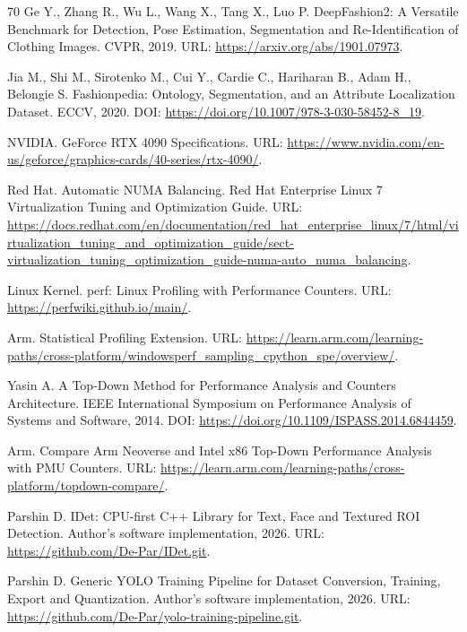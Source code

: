 \documentclass[12pt,a4paper,oneside,openany]{report}
\begin{document}
\begin{thebibliography}{70}
  Ge Y., Zhang R., Wu L., Wang X., Tang X., Luo P. DeepFashion2: A Versatile Benchmark for
  Detection, Pose Estimation, Segmentation and Re-Identification of Clothing Images. CVPR, 2019.
  URL: \url{https://arxiv.org/abs/1901.07973}.

  Jia M., Shi M., Sirotenko M., Cui Y., Cardie C., Hariharan B., Adam H., Belongie S.
  Fashionpedia: Ontology, Segmentation, and an Attribute Localization Dataset. ECCV, 2020. DOI:
  \url{https://doi.org/10.1007/978-3-030-58452-8_19}.


  NVIDIA. GeForce RTX 4090 Specifications. URL:
  \url{https://www.nvidia.com/en-us/geforce/graphics-cards/40-series/rtx-4090/}.

  Red Hat. Automatic NUMA Balancing. Red Hat Enterprise Linux 7 Virtualization Tuning and
  Optimization Guide. URL:
  \url{https://docs.redhat.com/en/documentation/red_hat_enterprise_linux/7/html/virtualization_tuning_and_optimization_guide/sect-virtualization_tuning_optimization_guide-numa-auto_numa_balancing}.

  Linux Kernel. perf: Linux Profiling with Performance Counters. URL:
  \url{https://perfwiki.github.io/main/}.

  Arm. Statistical Profiling Extension. URL:
  \url{https://learn.arm.com/learning-paths/cross-platform/windowsperf_sampling_cpython_spe/overview/}.

  Yasin A. A Top-Down Method for Performance Analysis and Counters Architecture. IEEE
  International Symposium on Performance Analysis of Systems and Software, 2014. DOI:
  \url{https://doi.org/10.1109/ISPASS.2014.6844459}.

  Arm. Compare Arm Neoverse and Intel x86 Top-Down Performance Analysis with PMU Counters. URL:
  \url{https://learn.arm.com/learning-paths/cross-platform/topdown-compare/}.


  Parshin D. IDet: CPU-first C++ Library for Text, Face and Textured ROI Detection. Author's
  software implementation, 2026. URL: \url{https://github.com/De-Par/IDet.git}.

  Parshin D. Generic YOLO Training Pipeline for Dataset Conversion, Training, Export and
  Quantization. Author's software implementation, 2026. URL: \url{https://github.com/De-Par/yolo-training-pipeline.git}.

\end{thebibliography}
\end{document}
